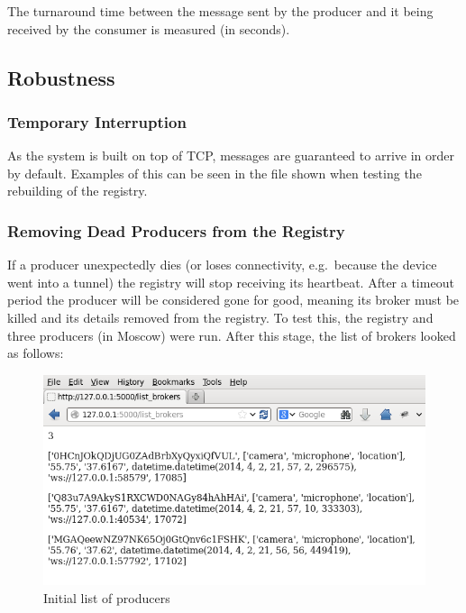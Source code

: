 The turnaround time between the message sent by the producer and it
being received by the consumer is measured (in seconds).

\subsection{Robustness}\label{robustness}

\subsubsection{Temporary Interruption}\label{temporary-interruption}

As the system is built on top of TCP, messages are guaranteed to arrive
in order by default. Examples of this can be seen in the file shown when
testing the rebuilding of the registry.

\subsubsection{Removing Dead Producers from the
Registry}\label{removing-dead-producers-from-the-registry}

If a producer unexpectedly dies (or loses connectivity, e.g.~because the
device went into a tunnel) the registry will stop receiving its
heartbeat. After a timeout period the producer will be considered gone
for good, meaning its broker must be killed and its details removed from
the registry. To test this, the registry and three producers (in Moscow)
were run. After this stage, the list of brokers looked as follows:

\begin{figure}[H]
\centering
\includegraphics{images/1-clean_producers/small_test_1-1.png}
\caption{Initial list of producers}
\end{figure}

